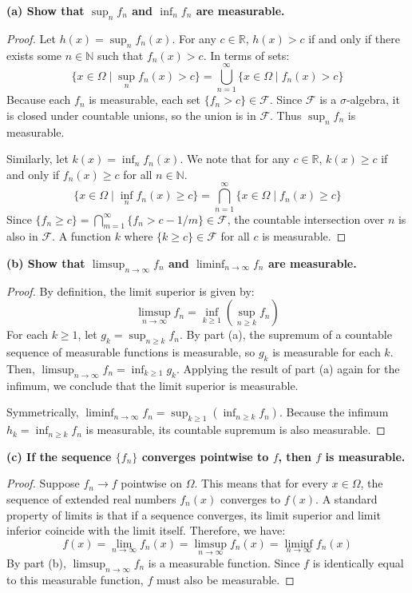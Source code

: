 \documentclass[11pt]{article}
\begin{document}
\vspace{0.5em}
\noindent \textbf{(a) Show that $\sup_n f_n$ and $\inf_n f_n$ are measurable.}

\begin{proof}
Let $h(x) = \sup_n f_n(x)$. For any $c \in \mathbb{R}$, $h(x) > c$ if and only if there exists some $n \in \mathbb{N}$ such that $f_n(x) > c$. In terms of sets:
\[ \{x \in \Omega \mid \sup_n f_n(x) > c\} = \bigcup_{n=1}^{\infty} \{x \in \Omega \mid f_n(x) > c\} \]
Because each $f_n$ is measurable, each set $\{f_n > c\} \in \mathcal{F}$. Since $\mathcal{F}$ is a $\sigma$-algebra, it is closed under countable unions, so the union is in $\mathcal{F}$. Thus $\sup_n f_n$ is measurable.

Similarly, let $k(x) = \inf_n f_n(x)$. We note that for any $c \in \mathbb{R}$, $k(x) \ge c$ if and only if $f_n(x) \ge c$ for all $n \in \mathbb{N}$.
\[ \{x \in \Omega \mid \inf_n f_n(x) \ge c\} = \bigcap_{n=1}^{\infty} \{x \in \Omega \mid f_n(x) \ge c\} \]
Since $\{f_n \ge c\} = \bigcap_{m=1}^{\infty} \{f_n > c - 1/m\} \in \mathcal{F}$, the countable intersection over $n$ is also in $\mathcal{F}$. A function $k$ where $\{k \ge c\} \in \mathcal{F}$ for all $c$ is measurable.
\end{proof}

\vspace{0.5em}
\noindent \textbf{(b) Show that $\limsup_{n \to \infty} f_n$ and $\liminf_{n \to \infty} f_n$ are measurable.}

\begin{proof}
By definition, the limit superior is given by:
\[ \limsup_{n \to \infty} f_n = \inf_{k \ge 1} \left( \sup_{n \ge k} f_n \right) \]
For each $k \ge 1$, let $g_k = \sup_{n \ge k} f_n$. By part (a), the supremum of a countable sequence of measurable functions is measurable, so $g_k$ is measurable for each $k$.
Then, $\limsup_{n \to \infty} f_n = \inf_{k \ge 1} g_k$. Applying the result of part (a) again for the infimum, we conclude that the limit superior is measurable.

Symmetrically, $\liminf_{n \to \infty} f_n = \sup_{k \ge 1} \left( \inf_{n \ge k} f_n \right)$. Because the infimum $h_k = \inf_{n \ge k} f_n$ is measurable, its countable supremum is also measurable.
\end{proof}

\vspace{0.5em}
\noindent \textbf{(c) If the sequence $\{f_n\}$ converges pointwise to $f$, then $f$ is measurable.}

\begin{proof}
Suppose $f_n \to f$ pointwise on $\Omega$. This means that for every $x \in \Omega$, the sequence of extended real numbers $f_n(x)$ converges to $f(x)$. 
A standard property of limits is that if a sequence converges, its limit superior and limit inferior coincide with the limit itself. Therefore, we have:
\[ f(x) = \lim_{n \to \infty} f_n(x) = \limsup_{n \to \infty} f_n(x) = \liminf_{n \to \infty} f_n(x) \]
By part (b), $\limsup_{n \to \infty} f_n$ is a measurable function. Since $f$ is identically equal to this measurable function, $f$ must also be measurable.
\end{proof}
\end{document}
